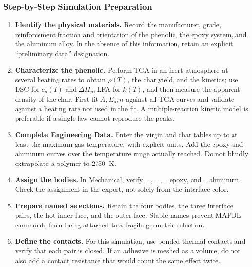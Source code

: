 \documentclass[oneside,openany]{amsdtx}
\begin{document}
\subsubsection{Step-by-Step Simulation Preparation}

\begin{enumerate}[leftmargin=2.2em,label=\textbf{\arabic*.}]
  \item \textbf{Identify the physical materials.} Record the manufacturer,
  grade, reinforcement fraction and orientation of the phenolic, the epoxy
  system, and the aluminum alloy. In the absence of this information, retain an
  explicit ``preliminary data'' designation.

  \item \textbf{Characterize the phenolic.} Perform TGA in an inert atmosphere
  at several heating rates to obtain \(\rho(T)\), the char yield, and the
  kinetics; use DSC for \(c_p(T)\) and \(\Delta H_p\), LFA for \(k(T)\), and
  then measure the apparent density of the char. First fit \(A,E_a,n\) against
  all TGA curves and validate against a heating rate not used in the fit. A
  multiple-reaction kinetic model is preferable if a single law cannot
  reproduce the peaks.

  \item \textbf{Complete Engineering Data.} Enter the virgin and char tables
  up to at least the maximum gas temperature, with explicit units. Add the epoxy
  and aluminum curves over the temperature range actually reached. Do not
  blindly extrapolate a polymer to \SI{2750}{K}.

  \item \textbf{Assign the bodies.} In Mechanical, verify
  =,
  =, =epoxy, and
  =aluminum. Check the assignment in the  export, not
  solely from the interface color.

  \item \textbf{Prepare named selections.} Retain the four bodies, the three
  interface pairs, the hot inner face, and the outer face. Stable names prevent
  MAPDL commands from being attached to a fragile geometric selection.

  \item \textbf{Define the contacts.} For this simulation, use bonded thermal
  contacts and verify that each pair is closed. If an adhesive is meshed as a
  volume, do not also add a contact resistance that would count the same effect
  twice.


\end{enumerate}
\end{document}
